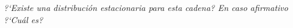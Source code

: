 \emph{
    ?`Existe una distribuci\'on estacionaria para esta cadena? En caso afirmativo ?`Cu\'al es?\pn
}
\afterstatement\pn